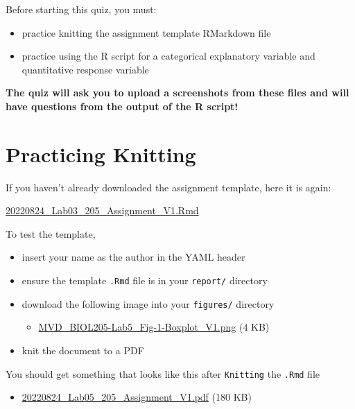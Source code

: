 \documentclass[
]{book}
\providecommand{\tightlist}{%
  \setlength{\itemsep}{0pt}\setlength{\parskip}{0pt}}
\begin{document}
Before starting this quiz, you must:

\begin{itemize}
\tightlist
\item
  practice knitting the assignment template RMarkdown file
\item
  practice using the R script for a categorical explanatory variable and quantitative response variable
\end{itemize}

\textbf{The quiz will ask you to upload a screenshots from these files and will have questions from the output of the R script!}

\hypertarget{practicing-knitting}{%
\section*{Practicing Knitting}\label{practicing-knitting}}

If you haven't already downloaded the assignment template, here it is again:

\href{https://osf.io/download/g5zxk}{20220824\_Lab03\_205\_Assignment\_V1.Rmd}

To test the template,

\begin{itemize}
\tightlist
\item
  insert your name as the author in the YAML header
\item
  ensure the template \texttt{.Rmd} file is in your \texttt{report/} directory
\item
  download the following image into your \texttt{figures/} directory

  \begin{itemize}
  \tightlist
  \item
    \href{https://osf.io/download/zuehg}{MVD\_BIOL205-Lab5\_Fig-1-Boxplot\_V1.png} (4 KB)
  \end{itemize}
\item
  knit the document to a PDF
\end{itemize}

You should get something that looks like this after \texttt{Knitting} the \texttt{.Rmd} file

\begin{itemize}
\tightlist
\item
  \href{https://osf.io/download/3k8ve}{20220824\_Lab05\_205\_Assignment\_V1.pdf} (180 KB)
\end{itemize}
\end{document}
